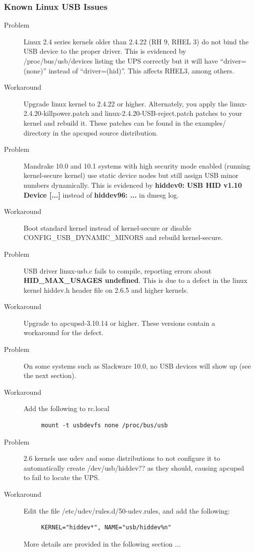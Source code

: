 \subsubsection*{Known Linux USB Issues}

\begin{description}
\item [Problem]
Linux 2.4 series kernels older than 2.4.22 (RH 9, RHEL 3) do not bind the
USB device to the proper driver. This is evidenced by /proc/bus/usb/devices
listing the UPS correctly but it will have ``driver=(none)'' instead of
``driver=(hid)''. This affects RHEL3, among others.  
\item [Workaround]
Upgrade linux kernel to 2.4.22 or higher. Alternately, you apply the
linux-2.4.20-killpower.patch and linux-2.4.20-USB-reject.patch patches
to your kernel and rebuild it. These patches can be found in the examples/
directory in the apcupsd source distribution.

\item [Problem]
Mandrake 10.0 and 10.1 systems with high security mode
enabled (running kernel-secure kernel) use static device nodes but still
assign USB minor numbers dynamically. This is evidenced by {\bf hiddev0: USB
HID v1.10 Device [...]} instead of {\bf hiddev96: ...} in dmesg log.  
\item [Workaround]
Boot standard kernel instead of kernel-secure or disable
CONFIG\_USB\_DYNAMIC\_MINORS and rebuild kernel-secure.  

\item [Problem]
USB driver linux-usb.c fails to compile, reporting errors
about {\bf HID\_MAX\_USAGES undefined}. This is due to a defect in the linux
kernel hiddev.h header file on 2.6.5 and higher kernels.  
\item [Workaround]
Upgrade to apcupsd-3.10.14 or higher. These versions contain a workaround 
for the defect.  

\item [Problem]
On some systems such as Slackware 10.0, no USB devices will
show up (see the next section).  
\item [Workaround]
Add the following to rc.local 

\footnotesize
\begin{verbatim}
     mount -t usbdevfs none /proc/bus/usb
\end{verbatim}
\normalsize

\item [Problem]
2.6 kernels use udev and some distributions to not configure it
to automatically create /dev/usb/hiddev?? as they should, causing apcupsd to
fail to locate the UPS.
\item [Workaround]
Edit the file /etc/udev/rules.d/50-udev.rules, and add the following: 

\footnotesize
\begin{verbatim}
     KERNEL="hiddev*", NAME="usb/hiddev%n"
\end{verbatim}
\normalsize

More details are provided in the following section ... 
\end{description}


